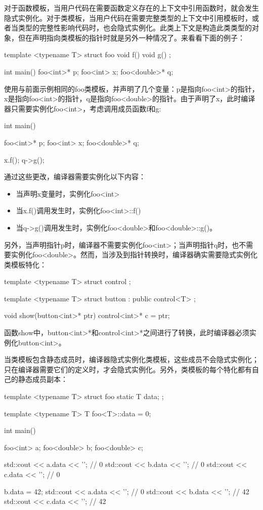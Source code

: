 对于函数模板，当用户代码在需要函数定义存在的上下文中引用函数时，就会发生隐式实例化。对于类模板，当用户代码在需要完整类型的上下文中引用模板时，或者当类型的完整性影响代码时，也会隐式实例化。此类上下文是构造此类类型的对象，但在声明指向类模板的指针时就是另外一种情况了。来看看下面的例子：

\begin{cppcode}
template <typename T>
struct foo
{
	void f() {}
	void g() {}
};

int main()
{
	foo<int>* p;
	foo<int> x;
	foo<double>* q;
}
\end{cppcode}

使用与前面示例相同的foo类模板，并声明了几个变量：p是指向foo<int>的指针，x是指向foo<int>的指针，q是指向foo<double>的指针。由于声明了x，此时编译器只需要实例化foo<int>，考虑调用成员函数f和g:

\begin{cppcode}
int main()
{
	foo<int>* p;
	foo<int> x;
	foo<double>* q;
	
	x.f();
	q->g();
}
\end{cppcode}

通过这些更改，编译器需要实例化以下内容：

\begin{itemize}
  \item 当声明x变量时，实例化foo<int>
  \item 当x.f()调用发生时，实例化foo<int>::f()
  \item 当q->g()调用发生时，实例化foo<double>和foo<double>::g()。
\end{itemize}

另外，当声明指针p时，编译器不需要实例化foo<int>；当声明指针q时，也不需要实例化foo<double>。然而，当涉及到指针转换时，编译器确实需要隐式实例化类模板特化：

\begin{cppcode}
template <typename T>
struct control
{};

template <typename T>
struct button : public control<T>
{};

void show(button<int>* ptr)
{
	control<int>* c = ptr;
}
\end{cppcode}

函数show中，button<int>*和control<int>*之间进行了转换，此时编译器必须实例化button<int>。

当类模板包含静态成员时，编译器隐式实例化类模板，这些成员不会隐式实例化；只在编译器需要它们的定义时，才会隐式实例化。另外，类模板的每个特化都有自己的静态成员副本：

\begin{cppcode}
template <typename T>
struct foo
{
	static T data;
};

template <typename T> T foo<T>::data = 0;

int main()
{
	foo<int> a;
	foo<double> b;
	foo<double> c;
	
	std::cout << a.data << '\n'; // 0
	std::cout << b.data << '\n'; // 0
	std::cout << c.data << '\n'; // 0
	
	b.data = 42;
	std::cout << a.data << '\n'; // 0
	std::cout << b.data << '\n'; // 42
	std::cout << c.data << '\n'; // 42
}
\end{cppcode}

